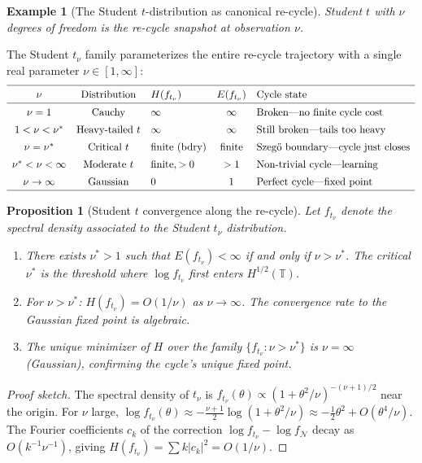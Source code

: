 \documentclass[12pt]{amsart}
\newtheorem{proposition}[theorem]{Proposition}
\theoremstyle{definition}
\newtheorem{example}[theorem]{Example}
\theoremstyle{remark}
\newcommand{\bT}{\mathbb{T}}
\newcommand{\cN}{\mathcal{N}}
\begin{document}
\begin{example}[The Student $t$-distribution as canonical re-cycle]\label{ex:student-t}
\emph{Student $t$ with $\nu$ degrees of freedom is the re-cycle snapshot at observation $\nu$.}

The Student $t_\nu$ family parameterizes the entire re-cycle trajectory with a single real parameter $\nu \in [1, \infty]$:
\[
\renewcommand{\arraystretch}{1.4}
\begin{array}{cclcl}
\hline
\nu & \text{Distribution} & H(f_{t_\nu}) & E(f_{t_\nu}) & \text{Cycle state} \\
\hline
\nu = 1 & \text{Cauchy} & \infty & \infty & \text{Broken---no finite cycle cost} \\
1 < \nu < \nu^* & \text{Heavy-tailed } t & \infty & \infty & \text{Still broken---tails too heavy} \\
\nu = \nu^* & \text{Critical } t & \text{finite (bdry)} & \text{finite} & \text{Szeg\H{o} boundary---cycle just closes} \\
\nu^* < \nu < \infty & \text{Moderate } t & \text{finite}, > 0 & > 1 & \text{Non-trivial cycle---learning} \\
\nu \to \infty & \text{Gaussian} & 0 & 1 & \text{Perfect cycle---fixed point} \\
\hline
\end{array}
\]
\end{example}

\begin{proposition}[Student $t$ convergence along the re-cycle]\label{prop:student-convergence}
Let $f_{t_\nu}$ denote the spectral density associated to the Student $t_\nu$ distribution.
\begin{enumerate}[label=(\roman*)]
\item There exists $\nu^* > 1$ such that $E(f_{t_\nu}) < \infty$ if and only if $\nu > \nu^*$. The critical $\nu^*$ is the threshold where $\log f_{t_\nu}$ first enters $H^{1/2}(\bT)$.
\item For $\nu > \nu^*$: $H(f_{t_\nu}) = O(1/\nu)$ as $\nu \to \infty$. The convergence rate to the Gaussian fixed point is algebraic.
\item The unique minimizer of $H$ over the family $\{f_{t_\nu} : \nu > \nu^*\}$ is $\nu = \infty$ (Gaussian), confirming the cycle's unique fixed point.
\end{enumerate}
\end{proposition}

\begin{proof}[Proof sketch]
The spectral density of $t_\nu$ is $f_{t_\nu}(\theta) \propto (1 + \theta^2/\nu)^{-(\nu+1)/2}$ near the origin. For $\nu$ large, $\log f_{t_\nu}(\theta) \approx -\tfrac{\nu+1}{2}\log(1+\theta^2/\nu) \approx -\tfrac{1}{2}\theta^2 + O(\theta^4/\nu)$. The Fourier coefficients $c_k$ of the correction $\log f_{t_\nu} - \log f_{\cN}$ decay as $O(k^{-1}\nu^{-1})$, giving $H(f_{t_\nu}) = \sum k|c_k|^2 = O(1/\nu)$.
\end{proof}
\end{document}
